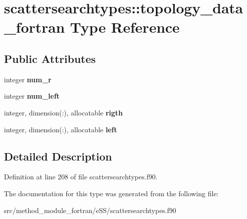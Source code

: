 \hypertarget{structscattersearchtypes_1_1topology__data__fortran}{\section{scattersearchtypes\-:\-:topology\-\_\-data\-\_\-fortran Type Reference}
\label{structscattersearchtypes_1_1topology__data__fortran}
}
\subsection*{Public Attributes}
\begin{DoxyCompactItemize}
\item 
\hypertarget{structscattersearchtypes_1_1topology__data__fortran_abe6a4ee07155b9d1bcf3ff38d962e418}{integer {\bfseries num\-\_\-r}}\label{structscattersearchtypes_1_1topology__data__fortran_abe6a4ee07155b9d1bcf3ff38d962e418}

\item 
\hypertarget{structscattersearchtypes_1_1topology__data__fortran_a16c03ff07dfd7ce7971fc65ec7e518f7}{integer {\bfseries num\-\_\-left}}\label{structscattersearchtypes_1_1topology__data__fortran_a16c03ff07dfd7ce7971fc65ec7e518f7}

\item 
\hypertarget{structscattersearchtypes_1_1topology__data__fortran_a4c1fcc49c3d3fdda543caa608d82d543}{integer, dimension(\-:), allocatable {\bfseries rigth}}\label{structscattersearchtypes_1_1topology__data__fortran_a4c1fcc49c3d3fdda543caa608d82d543}

\item 
\hypertarget{structscattersearchtypes_1_1topology__data__fortran_aa9594571ff2793df9c291359230aa44b}{integer, dimension(\-:), allocatable {\bfseries left}}\label{structscattersearchtypes_1_1topology__data__fortran_aa9594571ff2793df9c291359230aa44b}

\end{DoxyCompactItemize}


\subsection{Detailed Description}


Definition at line 208 of file scattersearchtypes.\-f90.



The documentation for this type was generated from the following file\-:\begin{DoxyCompactItemize}
\item 
src/method\-\_\-module\-\_\-fortran/e\-S\-S/scattersearchtypes.\-f90\end{DoxyCompactItemize}
